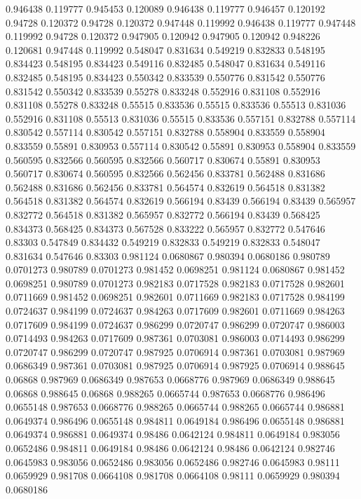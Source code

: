 0.946438 0.119777
0.945453 0.120089
0.946438 0.119777
0.946457 0.120192
0.94728 0.120372
0.94728 0.120372
0.947448 0.119992
0.946438 0.119777
0.947448 0.119992
0.94728 0.120372
0.947905 0.120942
0.947905 0.120942
0.948226 0.120681
0.947448 0.119992
0.548047 0.831634
0.549219 0.832833
0.548195 0.834423
0.548195 0.834423
0.549116 0.832485
0.548047 0.831634
0.549116 0.832485
0.548195 0.834423
0.550342 0.833539
0.550776 0.831542
0.550776 0.831542
0.550342 0.833539
0.55278 0.833248
0.552916 0.831108
0.552916 0.831108
0.55278 0.833248
0.55515 0.833536
0.55515 0.833536
0.55513 0.831036
0.552916 0.831108
0.55513 0.831036
0.55515 0.833536
0.557151 0.832788
0.557114 0.830542
0.557114 0.830542
0.557151 0.832788
0.558904 0.833559
0.558904 0.833559
0.55891 0.830953
0.557114 0.830542
0.55891 0.830953
0.558904 0.833559
0.560595 0.832566
0.560595 0.832566
0.560717 0.830674
0.55891 0.830953
0.560717 0.830674
0.560595 0.832566
0.562456 0.833781
0.562488 0.831686
0.562488 0.831686
0.562456 0.833781
0.564574 0.832619
0.564518 0.831382
0.564518 0.831382
0.564574 0.832619
0.566194 0.83439
0.566194 0.83439
0.565957 0.832772
0.564518 0.831382
0.565957 0.832772
0.566194 0.83439
0.568425 0.834373
0.568425 0.834373
0.567528 0.833222
0.565957 0.832772
0.547646 0.83303
0.547849 0.834432
0.549219 0.832833
0.549219 0.832833
0.548047 0.831634
0.547646 0.83303
0.981124 0.0680867
0.980394 0.0680186
0.980789 0.0701273
0.980789 0.0701273
0.981452 0.0698251
0.981124 0.0680867
0.981452 0.0698251
0.980789 0.0701273
0.982183 0.0717528
0.982183 0.0717528
0.982601 0.0711669
0.981452 0.0698251
0.982601 0.0711669
0.982183 0.0717528
0.984199 0.0724637
0.984199 0.0724637
0.984263 0.0717609
0.982601 0.0711669
0.984263 0.0717609
0.984199 0.0724637
0.986299 0.0720747
0.986299 0.0720747
0.986003 0.0714493
0.984263 0.0717609
0.987361 0.0703081
0.986003 0.0714493
0.986299 0.0720747
0.986299 0.0720747
0.987925 0.0706914
0.987361 0.0703081
0.987969 0.0686349
0.987361 0.0703081
0.987925 0.0706914
0.987925 0.0706914
0.988645 0.06868
0.987969 0.0686349
0.987653 0.0668776
0.987969 0.0686349
0.988645 0.06868
0.988645 0.06868
0.988265 0.0665744
0.987653 0.0668776
0.986496 0.0655148
0.987653 0.0668776
0.988265 0.0665744
0.988265 0.0665744
0.986881 0.0649374
0.986496 0.0655148
0.984811 0.0649184
0.986496 0.0655148
0.986881 0.0649374
0.986881 0.0649374
0.98486 0.0642124
0.984811 0.0649184
0.983056 0.0652486
0.984811 0.0649184
0.98486 0.0642124
0.98486 0.0642124
0.982746 0.0645983
0.983056 0.0652486
0.983056 0.0652486
0.982746 0.0645983
0.98111 0.0659929
0.981708 0.0664108
0.981708 0.0664108
0.98111 0.0659929
0.980394 0.0680186
